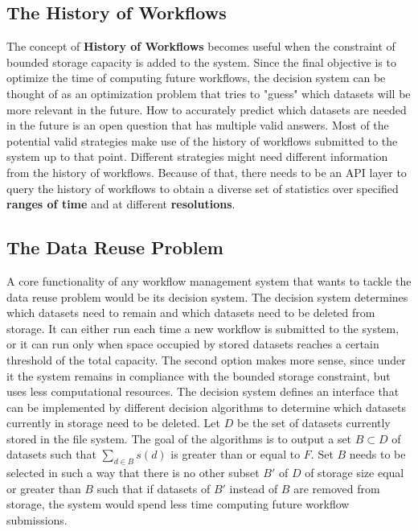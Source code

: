 \subsection{The History of Workflows}
The concept of \textbf{History of Workflows} becomes useful when the constraint of bounded storage capacity is added to the system. Since the final objective is to optimize the time of computing future workflows, the decision system can be thought of as an optimization problem that tries to "guess" which datasets will be more relevant in the future. How to accurately predict which datasets are needed in the future is an open question that has multiple valid answers. Most of the potential valid strategies make use of the history of workflows submitted to the system up to that point.  Different strategies might need different information from the history of workflows. Because of that, there needs to be an API layer to query the history of workflows to obtain a diverse set of statistics over specified \textbf{ranges of time} and at different \textbf{resolutions}.

\subsection{The Data Reuse Problem}
\label{sec:decision_system}
A core functionality of any workflow management system that wants to tackle the data reuse problem would be its decision system.  The decision system determines which datasets need to remain and which datasets need to be deleted from storage.  It can either run each time a new workflow is submitted to the system, or it can run only when space occupied by stored datasets reaches a certain threshold of the total capacity.  The second option makes more sense, since under it the system remains in compliance with the bounded storage constraint, but uses less computational resources. The decision system defines an interface that can be implemented by different decision algorithms to determine which datasets currently in storage need to be deleted. Let $D$ be the set of datasets currently stored in the file system. The goal of the algorithms is to output a set $B \subset D$ of datasets such that $\sum_{d \in B}{s(d)}$ is greater than or equal to $F$.  Set $B$ needs to be selected in such a way that there is no other subset $B'$ of $D$ of storage size equal or greater than $B$ such that if datasets of $B'$ instead of $B$ are removed from storage, the system would spend less time computing future workflow submissions. 


